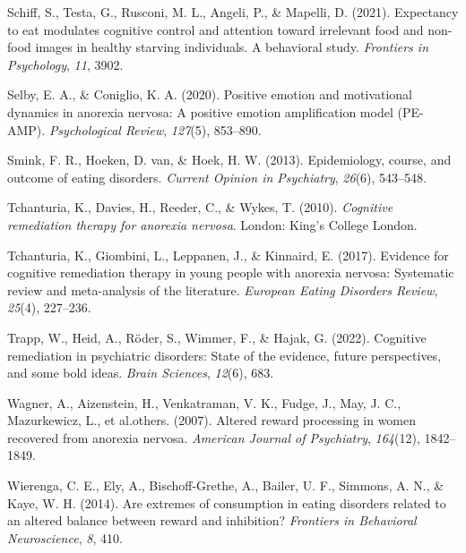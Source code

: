 \documentclass[
  man,floatsintext]{apa6}
\newlength{\cslhangindent}
\newlength{\cslentryspacingunit} %
\newenvironment{CSLReferences}[2] %
 {%
  \setlength{\parindent}{0pt}
  \ifodd #1
  \let\oldpar\par
  \def\par{\hangindent=\cslhangindent\oldpar}
  \fi
  \setlength{\parskip}{#2\cslentryspacingunit}
 }%
 {}
\begin{document}
\begin{CSLReferences}{1}{0}
\leavevmode{}%
Schiff, S., Testa, G., Rusconi, M. L., Angeli, P., \& Mapelli, D. (2021). Expectancy to eat modulates cognitive control and attention toward irrelevant food and non-food images in healthy starving individuals. A behavioral study. \emph{Frontiers in Psychology}, \emph{11}, 3902.

\leavevmode{}%
Selby, E. A., \& Coniglio, K. A. (2020). Positive emotion and motivational dynamics in anorexia nervosa: A positive emotion amplification model (PE-AMP). \emph{Psychological Review}, \emph{127}(5), 853--890.

\leavevmode{}%
Smink, F. R., Hoeken, D. van, \& Hoek, H. W. (2013). Epidemiology, course, and outcome of eating disorders. \emph{Current Opinion in Psychiatry}, \emph{26}(6), 543--548.

\leavevmode{}%
Tchanturia, K., Davies, H., Reeder, C., \& Wykes, T. (2010). \emph{Cognitive remediation therapy for anorexia nervosa}. London: King's College London.

\leavevmode{}%
Tchanturia, K., Giombini, L., Leppanen, J., \& Kinnaird, E. (2017). Evidence for cognitive remediation therapy in young people with anorexia nervosa: Systematic review and meta-analysis of the literature. \emph{European Eating Disorders Review}, \emph{25}(4), 227--236.

\leavevmode{}%
Trapp, W., Heid, A., Röder, S., Wimmer, F., \& Hajak, G. (2022). Cognitive remediation in psychiatric disorders: State of the evidence, future perspectives, and some bold ideas. \emph{Brain Sciences}, \emph{12}(6), 683.

\leavevmode{}%
Wagner, A., Aizenstein, H., Venkatraman, V. K., Fudge, J., May, J. C., Mazurkewicz, L., et al.others. (2007). Altered reward processing in women recovered from anorexia nervosa. \emph{American Journal of Psychiatry}, \emph{164}(12), 1842--1849.

\leavevmode{}%
Wierenga, C. E., Ely, A., Bischoff-Grethe, A., Bailer, U. F., Simmons, A. N., \& Kaye, W. H. (2014). Are extremes of consumption in eating disorders related to an altered balance between reward and inhibition? \emph{Frontiers in Behavioral Neuroscience}, \emph{8}, 410.


\end{CSLReferences}
\end{document}
